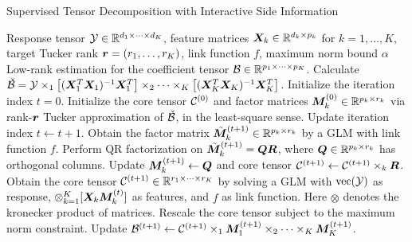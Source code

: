 \documentclass[12pt]{article}
\theoremstyle{plain}
\theoremstyle{definition}
\begin{document}
\begin{algorithm}[t]
\caption{Supervised Tensor Decomposition with Interactive Side Information}\label{alg:B}
\begin{algorithmic}[1]
\INPUT Response tensor $\mathcal{Y}\in \mathbb{R}^{d_1\times \cdots \times d_K}$, feature matrices $\bm X_k\in\mathbb{R}^{d_k\times p_k}$ for $k=1,\ldots,K$, target Tucker rank $\bm{r}=(r_1,\ldots,r_K)$, link function $f$, maximum norm bound $\alpha$
\OUTPUT Low-rank estimation for the coefficient tensor $\mathcal{B}\in\mathbb{R}^{p_1\times \cdots\times p_K}$. 
\State Calculate $\check {\mathcal{B}}=\mathcal{Y}\times_1 \left[(\bm X_1^T\bm X_1)^{-1}\bm X^T_1\right] \times_2\cdots\times_K\left[(\bm X_K^T\bm X_K)^{-1}\bm X^T_K\right] $.
\State Initialize the iteration index $t=0$. Initialize the core tensor $\mathcal{C}^{(0)}$ and factor matrices $\bm M^{(0)}_k\in\mathbb{R}^{p_k\times r_k}$ via rank-$\bm{r}$ Tucker approximation of $\check{\mathcal{B}}$, in the least-square sense. 
\State Update iteration index $t \leftarrow t+1$.
\State Obtain the factor matrix $\tilde {\bm M}_k^{(t+1)}\in\mathbb{R}^{p_k\times r_k}$ by a GLM with link function $f$. 
\State Perform QR factorization on $\tilde {\bm M}_k^{(t+1)}=\bm{Q}\bm{R}$, where $\bm{Q}\in\mathbb{R}^{p_k\times r_k}$ has orthogonal columns. 
\State Update $\bm M_k^{(t+1)}\leftarrow \bm{Q}$ and core tensor $\mathcal{C}^{(t+1)}\leftarrow \mathcal{C}^{(t+1)}\times_k \bm{R}$.
\EndFor
\State Obtain the core tensor $\mathcal{C}^{(t+1)}\in\mathbb{R}^{r_1\times\cdots\times r_K}$ by solving a GLM with $\text{vec}(\mathcal{Y})$ as response, $\otimes_{k=1}^K[ \bm X_k\bm M^{(t)}_k]$ as features, and $f$ as link function. Here $\otimes$ denotes the kronecker product of matrices. 
\State Rescale the core tensor subject to the maximum norm constraint. 
\State Update $\mathcal{B}^{(t+1)}\leftarrow \mathcal{C}^{(t+1)}\times_1\bm M_1^{(t+1)}\times_2\cdots\times_K\bm M_K^{(t+1)}$.
\EndWhile
\end{algorithmic}
\end{algorithm}
\end{document}
